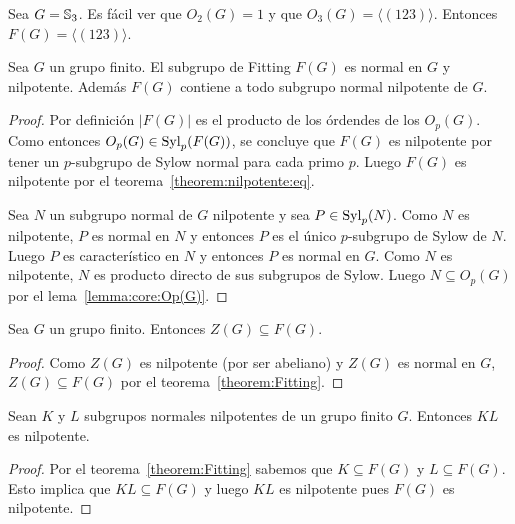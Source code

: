 \begin{example}
	Sea $G=\mathbb{S}_3$. Es fácil ver que $O_2(G)=1$ y que $O_3(G)=\langle
	(123)\rangle$. Entonces $F(G)=\langle (123)\rangle$.
\end{example}

\begin{theorem}[Fitting]
	\label{theorem:Fitting}
	Sea $G$ un grupo finito. El subgrupo de Fitting $F(G)$ es normal en $G$ y
	nilpotente. Además $F(G)$ contiene a todo subgrupo normal nilpotente de
	$G$.
\end{theorem}

\begin{proof}
	Por definición $|F(G)|$ es el producto de los órdendes de los $O_p(G)$.
	Como entonces $O_p(G)\in\mathrm{Syl}_p(F(G))$,  se concluye que $F(G)$ es
	nilpotente por tener un $p$-subgrupo de Sylow normal para cada primo $p$.
	Luego $F(G)$ es nilpotente por el teorema~\ref{theorem:nilpotente:eq}.

	Sea $N$ un subgrupo normal de $G$ nilpotente y sea $P\in\mathrm{Syl}_p(N)$. Como
	$N$ es nilpotente, $P$ es normal en $N$ y entonces $P$ es el único
	$p$-subgrupo de Sylow de $N$. Luego $P$ es característico en $N$ y entonces
	$P$ es normal en $G$. Como $N$ es nilpotente, $N$ es producto directo de
	sus subgrupos de Sylow. Luego $N\subseteq O_p(G)$ por el
	lema~\ref{lemma:core:Op(G)}.
\end{proof}

\begin{corollary}
	\label{corollary:Z(G)subsetF(G)}
	Sea $G$ un grupo finito. Entonces $Z(G)\subseteq F(G)$.
\end{corollary}

\begin{proof}
	Como $Z(G)$ es nilpotente (por ser abeliano) y $Z(G)$ es normal en $G$,
	$Z(G)\subseteq F(G)$ por el teorema~\ref{theorem:Fitting}.
\end{proof}

\begin{corollary}[Fitting]
	\label{corollary:Fitting}
	Sean $K$ y $L$ subgrupos normales nilpotentes de un grupo finito $G$.
	Entonces $KL$ es nilpotente.
\end{corollary}

\begin{proof}
	Por el teorema~\ref{theorem:Fitting} sabemos que $K\subseteq F(G)$ y
	$L\subseteq F(G)$. Esto implica que $KL\subseteq F(G)$ y luego $KL$ es
	nilpotente pues $F(G)$ es nilpotente.
\end{proof}

